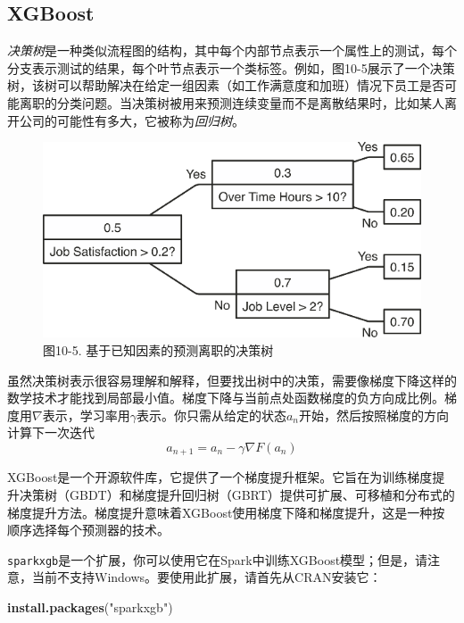 \documentclass[
]{article}
\newenvironment{Shaded}{\begin{snugshade}}{\end{snugshade}}
\newcommand{\KeywordTok}[1]{\textcolor[rgb]{0.13,0.29,0.53}{\textbf{#1}}}
\newcommand{\NormalTok}[1]{#1}
\newcommand{\StringTok}[1]{\textcolor[rgb]{0.31,0.60,0.02}{#1}}
\begin{document}
\hypertarget{xgboost}{%
\subsection{XGBoost}\label{xgboost}}

\emph{决策树}是一种类似流程图的结构，其中每个内部节点表示一个属性上的测试，每个分支表示测试的结果，每个叶节点表示一个类标签。例如，图10-5展示了一个决策树，该树可以帮助解决在给定一组因素（如工作满意度和加班）情况下员工是否可能离职的分类问题。当决策树被用来预测连续变量而不是离散结果时，比如某人离开公司的可能性有多大，它被称为\emph{回归树}。

\begin{figure}
\centering
\includegraphics{figures/10_5.png}
\caption{图10-5. 基于已知因素的预测离职的决策树}
\end{figure}

虽然决策树表示很容易理解和解释，但要找出树中的决策，需要像梯度下降这样的数学技术才能找到局部最小值。梯度下降与当前点处函数梯度的负方向成比例。梯度用\(\nabla\)表示，学习率用\(\gamma\)表示。你只需从给定的状态\(a_n\)开始，然后按照梯度的方向计算下一次迭代
\[a_{n + 1} = a_n − \gamma \nabla F(a_n)\]

XGBoost是一个开源软件库，它提供了一个梯度提升框架。它旨在为训练梯度提升决策树（GBDT）和梯度提升回归树（GBRT）提供可扩展、可移植和分布式的梯度提升方法。梯度提升意味着XGBoost使用梯度下降和梯度提升，这是一种按顺序选择每个预测器的技术。

\texttt{sparkxgb}是一个扩展，你可以使用它在Spark中训练XGBoost模型；但是，请注意，当前不支持Windows。要使用此扩展，请首先从CRAN安装它：

\begin{Shaded}
\begin{Highlighting}[]
\KeywordTok{install.packages}\NormalTok{(}\StringTok{"sparkxgb"}\NormalTok{)}
\end{Highlighting}
\end{Shaded}
\end{document}
